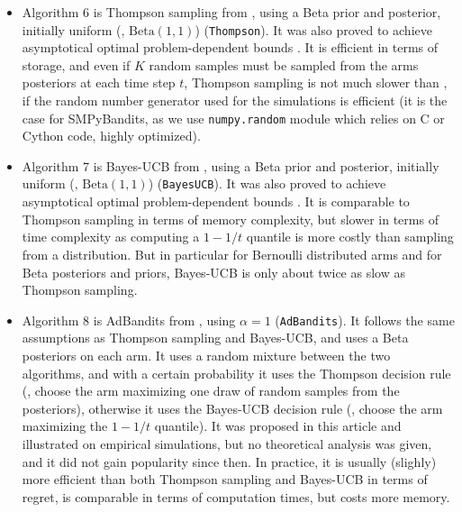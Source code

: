\begin{itemize}
    \item Algorithm 6 is
    Thompson sampling from \cite{Kaufmann12Thompson}, using a Beta prior and posterior, initially uniform (\ie, $\mathrm{Beta}(1,1)$) (\texttt{Thompson}).
    It was also proved to achieve asymptotical optimal problem-dependent bounds \cite{Kaufmann12Thompson,AgrawalGoyal11}.
    It is efficient in terms of storage, and even if $K$ random samples must be sampled from the arms posteriors at each time step $t$, Thompson sampling is not much slower than \UCB, if the random number generator used for the simulations is efficient (it is the case for SMPyBandits, as we use \texttt{numpy.random} module which relies on C or Cython code, highly optimized).

    \item Algorithm 7 is
    Bayes-UCB from \cite{Kaufmann12BUCB}, using a Beta prior and posterior, initially uniform (\ie, $\mathrm{Beta}(1,1)$) (\texttt{BayesUCB}).
    It was also proved to achieve asymptotical optimal problem-dependent bounds \cite{Kaufmann12BUCB}.
    It is comparable to Thompson sampling in terms of memory complexity, but slower in terms of time complexity as computing a $1-1/t$ quantile is more costly than sampling from a distribution.
    But in particular for Bernoulli distributed arms and for Beta posteriors and priors, Bayes-UCB is only about twice as slow as Thompson sampling.

    \item Algorithm 8 is
    AdBandits from \cite{Truzzi13}, using $\alpha=1$ (\texttt{AdBandits}).
    It follows the same assumptions as Thompson sampling and Bayes-UCB, and uses a Beta posteriors on each arm. It uses a random mixture between the two algorithms, and with a certain probability it uses the Thompson decision rule (\ie, choose the arm maximizing one draw of random samples from the posteriors), otherwise it uses the Bayes-UCB decision rule (\ie, choose the arm maximizing the $1-1/t$ quantile).
    It was proposed in this article and illustrated on empirical simulations, but no theoretical analysis was given, and it did not gain popularity since then.
    In practice, it is usually (slighly) more efficient than both Thompson sampling and Bayes-UCB in terms of regret, is comparable in terms of computation times, but costs more memory.


\end{itemize}
